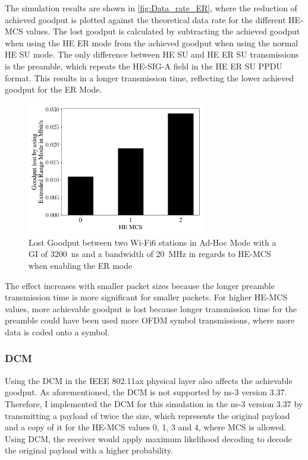 The simulation results are shown in \autoref{fig:Data_rate_ER}, where the reduction of achieved goodput is plotted against the theoretical data rate for the different \ac{HE}-\ac{MCS} values.
The lost goodput is calculated by subtracting the achieved goodput when using the \ac{HE} \ac{ER} mode from the achieved goodput when using the normal \ac{HE} SU mode.
The only difference between \ac{HE} SU and \ac{HE} \ac{ER} SU transmissions is the preamble, which repeats the \ac{HE}-SIG-A field in the \ac{HE} \ac{ER} SU \ac{PPDU} format.
This results in a longer transmission time, reflecting the lower achieved goodput for the \ac{ER} Mode.
\begin{figure}[H]%
   \centering
   \includegraphics[width=0.69\textwidth]{Latex/figures/ER_dataRate_simulation.pdf}
   \caption{Lost Goodput between two Wi-Fi6 stations in Ad-Hoc Mode with a
   \acf{GI} of \SI{3200}{\nano\second} and a bandwidth of \SI{20}{\mega\hertz} in regards to \acf{HE}-\acf{MCS} when enabling the \ac{ER} mode}%
   \label{fig:Data_rate_ER}%
\end{figure}
The effect increases with smaller packet sizes because the longer preamble transmission time is more significant for smaller packets.
For higher \ac{HE}-\ac{MCS} values, more achievable goodput is lost because longer transmission time for the preamble could have
been used more \ac{OFDM} symbol transmissions, where more data is coded onto a symbol.

\subsubsection*{\acf{DCM}}
Using the \ac{DCM} in the IEEE 802.11ax physical layer also affects the achievable goodput.
As aforementioned, the \ac{DCM} is not supported by ns-3 version 3.37.
Therefore, I implemented the \ac{DCM} for this simulation in the ns-3 version 3.37 by transmitting a payload of twice the size, which represents the original payload and a
copy of it for the \ac{HE}-\ac{MCS} values 0, 1, 3 and 4, where \ac{MCS} is allowed.
Using \ac{DCM}, the receiver would apply maximum likelihood decoding to decode the original payload with a higher probability.

